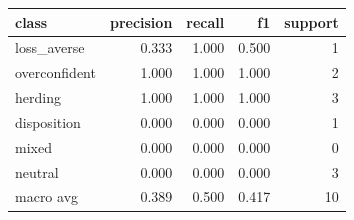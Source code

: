 \begin{tabular}{lrrrr}
\toprule
class & precision & recall & f1 & support \\
\midrule
loss_averse & 0.333 & 1.000 & 0.500 & 1 \\
overconfident & 1.000 & 1.000 & 1.000 & 2 \\
herding & 1.000 & 1.000 & 1.000 & 3 \\
disposition & 0.000 & 0.000 & 0.000 & 1 \\
mixed & 0.000 & 0.000 & 0.000 & 0 \\
neutral & 0.000 & 0.000 & 0.000 & 3 \\
macro avg & 0.389 & 0.500 & 0.417 & 10 \\
\bottomrule
\end{tabular}
